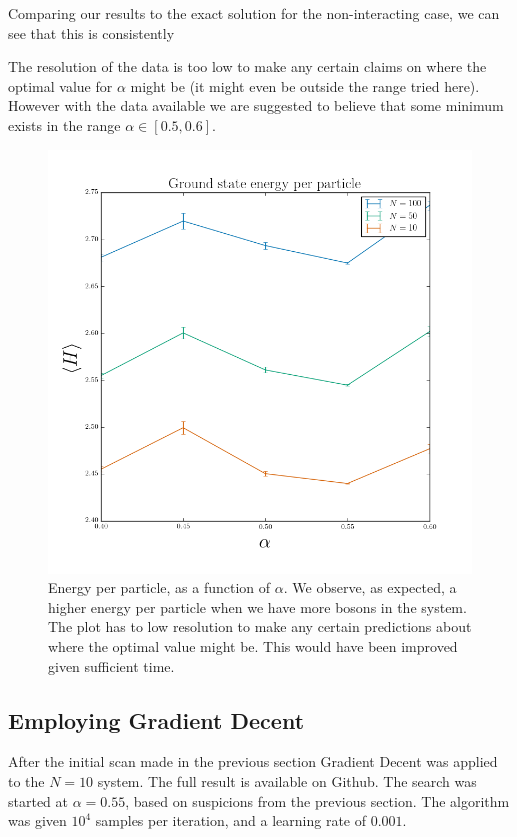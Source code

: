 \documentclass[twocolumn]{article}
\begin{document}
Comparing our results to the exact solution for the non-interacting case, we can
see that this is consistently 

The resolution of the data is too low to make any certain claims on where the
optimal value for $\alpha$ might be (it might even be outside the range tried
here). However with the data available we are suggested to believe that some
minimum exists in the range $\alpha\in [0.5, 0.6]$.

\begin{figure}[ht]
    \centering
    \includegraphics[width=0.8\linewidth]{../results/interacting-energy-per-particle.png}
    \caption{Energy per particle, as a function of $\alpha$. We observe, as
    expected, a higher energy per particle when we have more bosons in the
    system. The plot has to low resolution to make any certain predictions about
    where the optimal value might be. This would have been improved given
    sufficient time.}
    \label{fig:interacting-energy-per-particle}
\end{figure}

\subsection{Employing Gradient Decent}

After the initial scan made in the previous section Gradient Decent was applied
to the $N=10$ system. The full result is available on Github. The search was
started at $\alpha=0.55$, based on suspicions from the previous section. The
algorithm was given $10^4$ samples per iteration, and a learning rate of
$0.001$. 
\end{document}
